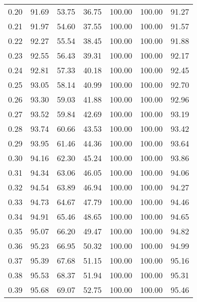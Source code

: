 \begin{tabular}{|c|c|c|c|c|c|c|}
      0.20 &     91.69 &     53.75 &      36.75 &  100.00 &     100.00 &         91.27 \\
      0.21 &     91.97 &     54.60 &      37.55 &  100.00 &     100.00 &         91.57 \\
      0.22 &     92.27 &     55.54 &      38.45 &  100.00 &     100.00 &         91.88 \\
      0.23 &     92.55 &     56.43 &      39.31 &  100.00 &     100.00 &         92.17 \\
      0.24 &     92.81 &     57.33 &      40.18 &  100.00 &     100.00 &         92.45 \\
      0.25 &     93.05 &     58.14 &      40.99 &  100.00 &     100.00 &         92.70 \\
      0.26 &     93.30 &     59.03 &      41.88 &  100.00 &     100.00 &         92.96 \\
      0.27 &     93.52 &     59.84 &      42.69 &  100.00 &     100.00 &         93.19 \\
      0.28 &     93.74 &     60.66 &      43.53 &  100.00 &     100.00 &         93.42 \\
      0.29 &     93.95 &     61.46 &      44.36 &  100.00 &     100.00 &         93.64 \\
      0.30 &     94.16 &     62.30 &      45.24 &  100.00 &     100.00 &         93.86 \\
      0.31 &     94.34 &     63.06 &      46.05 &  100.00 &     100.00 &         94.06 \\
      0.32 &     94.54 &     63.89 &      46.94 &  100.00 &     100.00 &         94.27 \\
      0.33 &     94.73 &     64.67 &      47.79 &  100.00 &     100.00 &         94.46 \\
      0.34 &     94.91 &     65.46 &      48.65 &  100.00 &     100.00 &         94.65 \\
      0.35 &     95.07 &     66.20 &      49.47 &  100.00 &     100.00 &         94.82 \\
      0.36 &     95.23 &     66.95 &      50.32 &  100.00 &     100.00 &         94.99 \\
      0.37 &     95.39 &     67.68 &      51.15 &  100.00 &     100.00 &         95.16 \\
      0.38 &     95.53 &     68.37 &      51.94 &  100.00 &     100.00 &         95.31 \\
      0.39 &     95.68 &     69.07 &      52.75 &  100.00 &     100.00 &         95.46 \\

\end{tabular}
